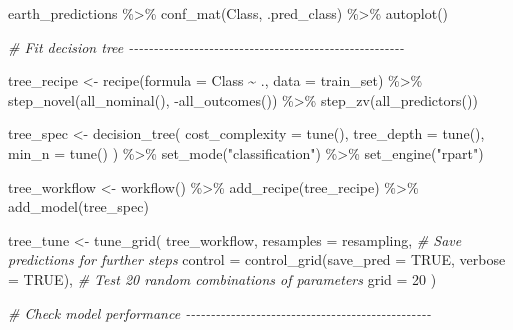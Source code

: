 \documentclass[
]{book}
\newenvironment{Shaded}{\begin{snugshade}}{\end{snugshade}}
\newcommand{\AttributeTok}[1]{\textcolor[rgb]{0.77,0.63,0.00}{#1}}
\newcommand{\CommentTok}[1]{\textcolor[rgb]{0.56,0.35,0.01}{\textit{#1}}}
\newcommand{\ConstantTok}[1]{\textcolor[rgb]{0.00,0.00,0.00}{#1}}
\newcommand{\DecValTok}[1]{\textcolor[rgb]{0.00,0.00,0.81}{#1}}
\newcommand{\FunctionTok}[1]{\textcolor[rgb]{0.00,0.00,0.00}{#1}}
\newcommand{\NormalTok}[1]{#1}
\newcommand{\OtherTok}[1]{\textcolor[rgb]{0.56,0.35,0.01}{#1}}
\newcommand{\SpecialCharTok}[1]{\textcolor[rgb]{0.00,0.00,0.00}{#1}}
\newcommand{\StringTok}[1]{\textcolor[rgb]{0.31,0.60,0.02}{#1}}
\begin{document}
\begin{Shaded}
\begin{Highlighting}[]
\NormalTok{earth\_predictions }\SpecialCharTok{\%\textgreater{}\%}
  \FunctionTok{conf\_mat}\NormalTok{(Class, .pred\_class) }\SpecialCharTok{\%\textgreater{}\%}
  \FunctionTok{autoplot}\NormalTok{()}


\CommentTok{\# Fit decision tree {-}{-}{-}{-}{-}{-}{-}{-}{-}{-}{-}{-}{-}{-}{-}{-}{-}{-}{-}{-}{-}{-}{-}{-}{-}{-}{-}{-}{-}{-}{-}{-}{-}{-}{-}{-}{-}{-}{-}{-}{-}{-}{-}{-}{-}{-}{-}{-}{-}{-}{-}{-}{-}{-}{-}}

\NormalTok{tree\_recipe }\OtherTok{\textless{}{-}} 
  \FunctionTok{recipe}\NormalTok{(}\AttributeTok{formula =}\NormalTok{ Class }\SpecialCharTok{\textasciitilde{}}\NormalTok{ ., }\AttributeTok{data =}\NormalTok{ train\_set) }\SpecialCharTok{\%\textgreater{}\%} 
  \FunctionTok{step\_novel}\NormalTok{(}\FunctionTok{all\_nominal}\NormalTok{(), }\SpecialCharTok{{-}}\FunctionTok{all\_outcomes}\NormalTok{()) }\SpecialCharTok{\%\textgreater{}\%} 
  \FunctionTok{step\_zv}\NormalTok{(}\FunctionTok{all\_predictors}\NormalTok{()) }

\NormalTok{tree\_spec }\OtherTok{\textless{}{-}} 
  \FunctionTok{decision\_tree}\NormalTok{(}
    \AttributeTok{cost\_complexity =} \FunctionTok{tune}\NormalTok{(),}
    \AttributeTok{tree\_depth =} \FunctionTok{tune}\NormalTok{(),}
    \AttributeTok{min\_n =} \FunctionTok{tune}\NormalTok{()}
\NormalTok{    ) }\SpecialCharTok{\%\textgreater{}\%} 
  \FunctionTok{set\_mode}\NormalTok{(}\StringTok{"classification"}\NormalTok{) }\SpecialCharTok{\%\textgreater{}\%} 
  \FunctionTok{set\_engine}\NormalTok{(}\StringTok{"rpart"}\NormalTok{) }

\NormalTok{tree\_workflow }\OtherTok{\textless{}{-}} 
  \FunctionTok{workflow}\NormalTok{() }\SpecialCharTok{\%\textgreater{}\%} 
  \FunctionTok{add\_recipe}\NormalTok{(tree\_recipe) }\SpecialCharTok{\%\textgreater{}\%} 
  \FunctionTok{add\_model}\NormalTok{(tree\_spec) }

\NormalTok{tree\_tune }\OtherTok{\textless{}{-}} 
  \FunctionTok{tune\_grid}\NormalTok{(}
\NormalTok{    tree\_workflow, }
    \AttributeTok{resamples =}\NormalTok{ resampling, }
    \CommentTok{\# Save predictions for further steps}
    \AttributeTok{control =} \FunctionTok{control\_grid}\NormalTok{(}\AttributeTok{save\_pred =} \ConstantTok{TRUE}\NormalTok{, }\AttributeTok{verbose =} \ConstantTok{TRUE}\NormalTok{),}
    \CommentTok{\# Test 20 random combinations of parameters}
    \AttributeTok{grid =} \DecValTok{20}
\NormalTok{  ) }

\CommentTok{\# Check model performance {-}{-}{-}{-}{-}{-}{-}{-}{-}{-}{-}{-}{-}{-}{-}{-}{-}{-}{-}{-}{-}{-}{-}{-}{-}{-}{-}{-}{-}{-}{-}{-}{-}{-}{-}{-}{-}{-}{-}{-}{-}{-}{-}{-}{-}{-}{-}{-}{-}}


\end{Highlighting}
\end{Shaded}
\end{document}
